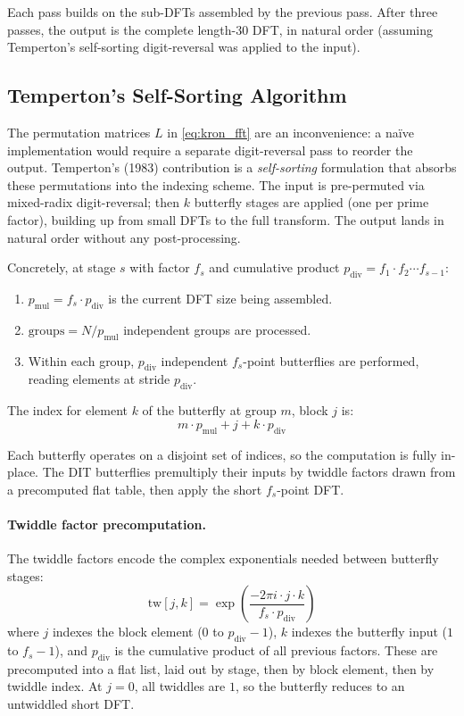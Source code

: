 \documentclass[12pt,a4paper]{report}
\theoremstyle{thms}
\theoremstyle{defns}
\begin{document}
Each pass builds on the sub-DFTs assembled by the previous pass. After three passes, the output is the complete length-30 DFT, in natural order (assuming Temperton's self-sorting digit-reversal was applied to the input).

\subsection{Temperton's Self-Sorting Algorithm}

The permutation matrices $L$ in \eqref{eq:kron_fft} are an inconvenience: a na\"ive implementation would require a separate digit-reversal pass to reorder the output. Temperton's (1983) contribution \cite{temperton_self_sorting} is a \textit{self-sorting} formulation that absorbs these permutations into the indexing scheme. The input is pre-permuted via mixed-radix digit-reversal; then $k$ butterfly stages are applied (one per prime factor), building up from small DFTs to the full transform. The output lands in natural order without any post-processing.

Concretely, at stage $s$ with factor $f_s$ and cumulative product $p_{\mathrm{div}} = f_1 \cdot f_2 \cdots f_{s-1}$:
\begin{enumerate}
    \item $p_{\mathrm{mul}} = f_s \cdot p_{\mathrm{div}}$ is the current DFT size being assembled.
    \item $\mathrm{groups} = N / p_{\mathrm{mul}}$ independent groups are processed.
    \item Within each group, $p_{\mathrm{div}}$ independent $f_s$-point butterflies are performed, reading elements at stride $p_{\mathrm{div}}$.
\end{enumerate}

The index for element $k$ of the butterfly at group $m$, block $j$ is:
\begin{equation}
    m \cdot p_{\mathrm{mul}} + j + k \cdot p_{\mathrm{div}}
    \label{eq:butterfly_index}
\end{equation}

Each butterfly operates on a disjoint set of indices, so the computation is fully in-place. The DIT butterflies premultiply their inputs by twiddle factors drawn from a precomputed flat table, then apply the short $f_s$-point DFT.

\paragraph{Twiddle factor precomputation.} The twiddle factors encode the complex exponentials needed between butterfly stages:
\begin{equation}
    \mathrm{tw}[j, k] = \exp\!\left(\frac{-2\pi i \cdot j \cdot k}{f_s \cdot p_{\mathrm{div}}}\right)
\end{equation}
where $j$ indexes the block element ($0$ to $p_{\mathrm{div}} - 1$), $k$ indexes the butterfly input ($1$ to $f_s - 1$), and $p_{\mathrm{div}}$ is the cumulative product of all previous factors. These are precomputed into a flat list, laid out by stage, then by block element, then by twiddle index. At $j = 0$, all twiddles are $1$, so the butterfly reduces to an untwiddled short DFT.
\end{document}
